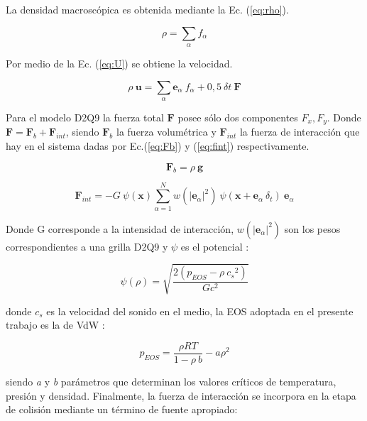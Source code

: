 La densidad macroscópica es obtenida mediante la Ec. (\ref{eq:rho}).

\begin{equation}
        \rho = \sum_{\alpha} f_{\alpha}
        \label{eq:rho}
\end{equation}

Por medio de la Ec. (\ref{eq:U}) se obtiene la velocidad.

\begin{equation}
    \rho \> \mathbf{u} = \sum_{\alpha} {\mathbf{e}}_{\alpha} \> f_{\alpha} + 0,5 \> {\delta}{t} \> \mathbf{F}
    \label{eq:U}
\end{equation}

Para el modelo D2Q9 la fuerza total $\mathbf{F}$ posee sólo dos componentes $F_{x} , F_{y}$. Donde $ {\mathbf{F}} = {\mathbf{F}}_{b} + {\mathbf{F}}_{int} $, siendo ${\mathbf{F}}_{b}$ la fuerza volumétrica y ${\mathbf{F}}_{int}$ la fuerza de interacción que hay en el sistema dadas por Ec.(\ref{eq:Fb}) y (\ref{eq:fint}) respectivamente.

\begin{equation}
	{\mathbf{F}}_{b} = \rho \> \mathbf{g}
	\label{eq:Fb}
\end{equation}


\begin{equation}
{\mathbf{F}}_{int} = - G \> \psi(\mathbf{x}) \sum_{\alpha=1}^{N} w({|{\mathbf{e}}_{\alpha}|}^{2}) \> \psi (\mathbf{x} + {\mathbf{e}}_{\alpha} \> \delta_{t}) \> {\mathbf{e}}_{\alpha} 
\label{eq:fint}
\end{equation}

Donde G corresponde a la intensidad de interacción, $w({|{\mathbf{e}}_{\alpha}|}^{2})$ son los pesos correspondientes a una grilla D2Q9 y $\psi$ es el potencial :

\begin{equation} 
    \psi(\rho) = \sqrt{\frac{2 (p_{EOS} - \rho \> {c_{s}}^{2})}{G {c}^{2}}}
    \label{eq:psi}
\end{equation}

donde $c_{s}$ es la velocidad del sonido en el medio, la EOS adoptada en el presente trabajo es la de VdW :

\begin{equation}
    p_{EOS} = \frac{\rho R T}{1- \rho \> b} - a {\rho}^{2}
    \label{eq:rho_eos}
\end{equation}

siendo \textit{a} y \textit{b} parámetros que determinan los valores críticos de temperatura, presión y densidad. Finalmente, la fuerza de interacción se incorpora en la etapa de colisión mediante un término de fuente apropiado:


